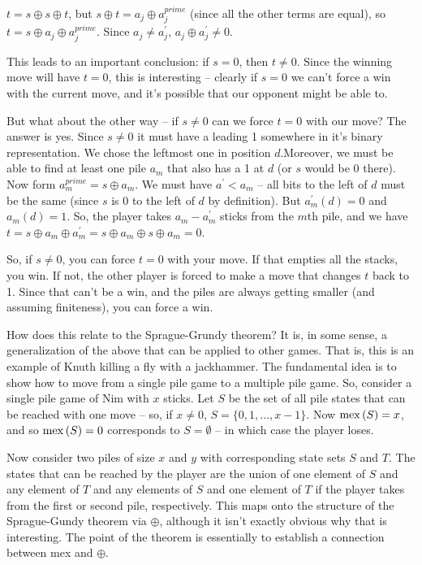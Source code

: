 $t = s \oplus s \oplus t$, but $s \oplus t = a_j \oplus a^{prime}_j$
(since all the other terms are equal), so
$t = s \oplus a_j \oplus a^{prime}_j$.  Since $a_j \ne a^{\prime}_j$,
$a_j \oplus a^{\prime}_j \ne 0$.

This leads to an important conclusion: if $s = 0$, then $t \ne 0$.
Since the winning move will have $t = 0$, this is interesting -- 
clearly if $s=0$ we can't force a win with the current move, and it's
possible that our opponent might be able to.  

But what about the other way -- if $s \ne 0$ can we force $t = 0$ with our 
move?  The answer is yes.  Since $s \ne 0$ it must have a leading 1
somewhere in it's binary representation.  We chose the leftmost one in
position $d$.Moreover, we must be able to
find at least one pile $a_m$ that also has a 1 at $d$ (or $s$
would be 0 there).  Now form $a^{prime}_m = s \oplus a_m$.  We must
have $a^{\prime} < a_m$ -- all bits to the left of $d$ must
be the same (since $s$ is 0 to the left of $d$ by definition).
But $a^{\prime}_m \left(d \right) = 0$ and $a_m\left(d\right) = 1$.
So, the player takes $a_m - a^{\prime}_m$ sticks from the $m$th pile,
and we have $t = s \oplus a_m \oplus a^{\prime}_m = s \oplus a_m 
\oplus s \oplus a_m = 0$.

So, if $s \ne 0$, you can force $t = 0$ with your move.  If that 
empties all the stacks, you win.  If not, the other player is forced
to make a move that changes $t$ back to 1.  Since that can't be a win,
and the piles are always getting smaller (and assuming finiteness),
you can force a win.

How does this relate to the Sprague-Grundy theorem?  It is, in some
sense, a generalization of the above that can be applied to other games.
That is, this is an example of Knuth killing a fly with a jackhammer.
The fundamental idea is to show how to move from a single pile game
to a multiple pile game. So, consider a single pile game of Nim with
$x$ sticks.  Let $S$ be the set of all pile states that can be reached
with one move -- so, if $x \ne 0$, $S = \{0, 1, \ldots, x-1\}$.
Now ${\rm mex}\left(S\right) = x$, and so ${\rm mex}\left(S\right) = 0$
corresponds to $S = \emptyset$ -- in which case the player loses.

Now consider two piles of size $x$ and $y$ with corresponding state
sets $S$ and $T$.  The states that can be reached by the player are 
the union of one element of $S$ and any element of $T$ and 
any elements of $S$ and one element of $T$ if the player takes from
the first or second pile, respectively.  This maps onto the structure
of the Sprague-Gundy theorem via $\oplus$, although it isn't exactly
obvious why that is interesting.  The point of the theorem is essentially
to establish a connection between mex and $\oplus$.

